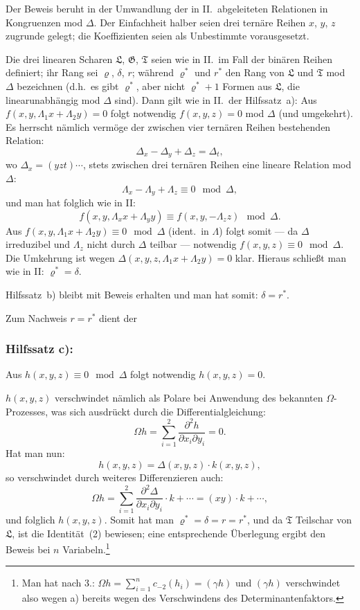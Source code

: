 \documentclass[12pt,a4paper]{article}
\begin{document}
Der Beweis beruht in der Umwandlung der in II.\ abgeleiteten Relationen in Kongruenzen mod $\Delta$. Der Einfachheit halber seien drei tern\"are Reihen $x$, $y$, $z$ zugrunde gelegt; die Koeffizienten seien als Unbestimmte vorausgesetzt.

Die drei linearen Scharen $\mathfrak{L}$, $\mathfrak{G}$, $\mathfrak{T}$ seien wie in II.\ im Fall der bin\"aren Reihen definiert; ihr Rang sei $\varrho$, $\delta$, $r$; w\"ahrend $\varrho^*$ und $r^*$ den Rang von $\mathfrak{L}$ und $\mathfrak{T}$ mod $\Delta$ bezeichnen (d.h.\ es gibt $\varrho^*$, aber nicht $\varrho^*+1$ Formen aus $\mathfrak{L}$, die linearunabh\"angig mod $\Delta$ sind). Dann gilt wie in II.\ der Hilfssatz~a): Aus $f(x, y, \Lambda_1 x + \Lambda_2 y) = 0$ folgt notwendig $f(x, y, z) = 0$ mod $\Delta$ (und umgekehrt). Es herrscht n\"amlich verm\"oge der zwischen vier tern\"aren Reihen bestehenden Relation:
\[\Delta_x - \Delta_y + \Delta_z = \Delta_t,\]
wo $\Delta_x = (yzt)\cdots$, stets zwischen drei tern\"aren Reihen eine lineare Relation mod $\Delta$:
\[\Lambda_x - \Lambda_y + \Lambda_z \equiv 0 \mod \Delta,\]
und man hat folglich wie in II:
\[f(x, y, \Lambda_x x + \Lambda_y y) \equiv f(x, y, -\Lambda_z z) \mod \Delta.\]
Aus $f(x, y, \Lambda_1 x + \Lambda_2 y) \equiv 0 \mod \Delta$ (ident.\ in $\Lambda$) folgt somit --- da $\Delta$ irreduzibel und $\Lambda_z$ nicht durch $\Delta$ teilbar --- notwendig $f(x, y, z) \equiv 0 \mod \Delta$. Die Umkehrung ist wegen $\Delta(x, y, z, \Lambda_1 x + \Lambda_2 y) = 0$ klar. Hieraus schlie\ss t man wie in II: $\varrho^* = \delta$.

Hilfssatz~b) bleibt mit Beweis erhalten und man hat somit: $\delta = r^*$.

Zum Nachweis $r = r^*$ dient der

\subsubsection*{Hilfssatz c):}

Aus $h(x, y, z) \equiv 0 \mod \Delta$ folgt notwendig $h(x, y, z) = 0$.

$h(x, y, z)$ verschwindet n\"amlich als Polare bei Anwendung des bekannten $\Omega$-Prozesses, was sich ausdr\"uckt durch die Differentialgleichung:
\[\Omega h = \sum_{i=1}^{2} \frac{\partial^2 h}{\partial x_i \partial y_i} = 0.\]
Hat man nun:
\[h(x, y, z) = \Delta(x, y, z) \cdot k(x, y, z),\]
so verschwindet durch weiteres Differenzieren auch:
\[\Omega h = \sum_{i=1}^{2} \frac{\partial^2 \Delta}{\partial x_i \partial y_i} \cdot k + \cdots = (xy) \cdot k + \cdots,\]
und folglich $h(x, y, z)$. Somit hat man $\varrho^* = \delta = r = r^*$, und da $\mathfrak{T}$ Teilschar von $\mathfrak{L}$, ist die Identit\"at~(2) bewiesen; eine entsprechende \"Uberlegung ergibt den Beweis bei $n$ Variabeln.\footnote{Man hat nach 3.: $\Omega h = \sum_{i=1}^{n} c_{-2}(h_i) = (\gamma h)$ und $(\gamma h)$ verschwindet also wegen a) bereits wegen des Verschwindens des Determinantenfaktors.}
\end{document}
